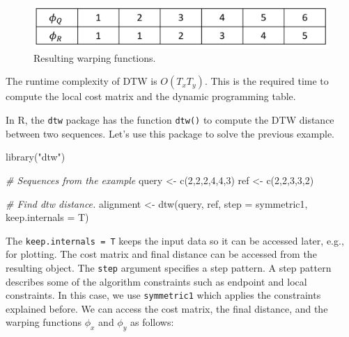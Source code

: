 \documentclass[
  11pt,
]{krantz}
\newenvironment{Shaded}{\begin{snugshade}}{\end{snugshade}}
\newcommand{\AttributeTok}[1]{\textcolor[rgb]{0.61,0.61,0.61}{#1}}
\newcommand{\CommentTok}[1]{\textcolor[rgb]{0.37,0.37,0.37}{\textit{#1}}}
\newcommand{\DecValTok}[1]{\textcolor[rgb]{0.06,0.06,0.06}{#1}}
\newcommand{\FunctionTok}[1]{\textcolor[rgb]{0,0,0}{#1}}
\newcommand{\NormalTok}[1]{#1}
\newcommand{\OtherTok}[1]{\textcolor[rgb]{0.37,0.37,0.37}{#1}}
\newcommand{\StringTok}[1]{\textcolor[rgb]{0.5,0.5,0.5}{#1}}
\begin{document}
\begin{figure}

{\centering \includegraphics[width=0.7\linewidth]{images/warpingResult} 

}

\caption{Resulting warping functions.}\label{fig:warpingResult}
\end{figure}

The runtime complexity of DTW is \(O(T_x T_y)\). This is the required time to compute the local cost matrix and the dynamic programming table.

In R, the \texttt{dtw} package \citep{giorgino2009} has the function \texttt{dtw()} to compute the DTW distance between two sequences. Let's use this package to solve the previous example.

\begin{Shaded}
\begin{Highlighting}[]
\FunctionTok{library}\NormalTok{(}\StringTok{"dtw"}\NormalTok{)}

\CommentTok{\# Sequences from the example}
\NormalTok{query }\OtherTok{\textless{}{-}} \FunctionTok{c}\NormalTok{(}\DecValTok{2}\NormalTok{,}\DecValTok{2}\NormalTok{,}\DecValTok{2}\NormalTok{,}\DecValTok{4}\NormalTok{,}\DecValTok{4}\NormalTok{,}\DecValTok{3}\NormalTok{)}
\NormalTok{ref }\OtherTok{\textless{}{-}} \FunctionTok{c}\NormalTok{(}\DecValTok{2}\NormalTok{,}\DecValTok{2}\NormalTok{,}\DecValTok{3}\NormalTok{,}\DecValTok{3}\NormalTok{,}\DecValTok{2}\NormalTok{)}

\CommentTok{\# Find dtw distance.}
\NormalTok{alignment }\OtherTok{\textless{}{-}} \FunctionTok{dtw}\NormalTok{(query, ref,}
                 \AttributeTok{step =}\NormalTok{ symmetric1, }\AttributeTok{keep.internals =}\NormalTok{ T)}
\end{Highlighting}
\end{Shaded}

The \texttt{keep.internals\ =\ T} keeps the input data so it can be accessed later, e.g., for plotting. The cost matrix and final distance can be accessed from the resulting object. The \texttt{step} argument specifies a step pattern. A step pattern describes some of the algorithm constraints such as endpoint and local constraints. In this case, we use \texttt{symmetric1} which applies the constraints explained before. We can access the cost matrix, the final distance, and the warping functions \(\phi_x\) and \(\phi_y\) as follows:
\end{document}

